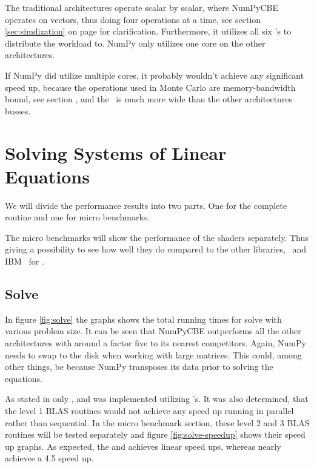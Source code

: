 The traditional architectures operate scalar by scalar, where NumPyCBE
operates on vectors, thus doing four operations at a time, see section
\ref{sec:simdization} on page \pageref{sec:simdization} for
clarification. Furthermore, it utilizes all six \SPE{}'s to distribute the
workload to. NumPy only utilizes one core on the other architectures.

If NumPy did utilize multiple cores, it probably wouldn't achieve any
significant speed up, because the operations used in Monte Carlo are
memory-bandwidth bound, see section , and
the \EIB\ is much more wide than the other architectures busses.


\section{Solving Systems of Linear Equations}

We will divide the performance results into two parts. One for the
complete routine and one for micro benchmarks.

The micro benchmarks will show the performance of the shaders
separately. Thus giving a possibility to see how well they do compared
to the other libraries, \ATLAS\ and IBM \BLAS\ for \CBE{}.



\subsection{Solve}

In figure \ref{fig:solve} the graphs shows the total running times for
solve with various problem size. It can be seen that NumPyCBE
outperforms all the other architectures with around a factor five to
its nearest competitors. Again, NumPy needs to swap to the disk when
working with large matrices. This could, among other things, be
because NumPy transposes its data prior to solving the equations.

As stated in 
only ,  and  was
implemented utilizing \SPE{}'s. It was also determined, that the level
1 BLAS routines would not achieve any speed up running in parallel
rather than sequential. In the micro benchmark section, these level 2
and 3 BLAS routines will be tested separately and
figure \ref{fig:solve-speedup} shows their speed up graphs. As
expected, the  and  achieves linear
speed ups, whereas  nearly achieves a 4.5 speed up.

